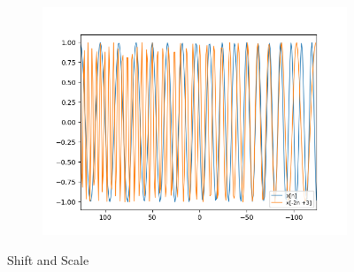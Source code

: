 \documentclass[10pt,a4paper, margin=1in]{article}
\begin{document}
\begin{figure}[h]
\begin{subfigure}[t]{0.3\linewidth}
        \includegraphics[width=1\linewidth]{assets/q7b/chirp_part_b.png}
    \end{subfigure}
    \caption{Shift and Scale}
\end{figure}
\end{document}
